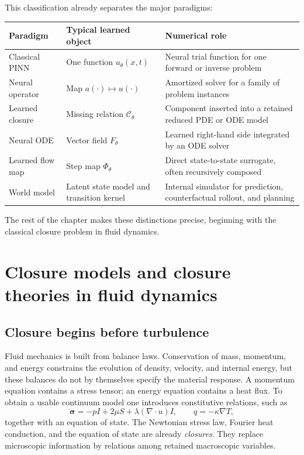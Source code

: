 \documentclass[11pt]{article}
\newcommand{\C}{\mathcal{C}}
\begin{document}
This classification already separates the major paradigms:

\begin{center}
\begin{tabularx}{\textwidth}{@{}P{0.19\textwidth}Y Y@{}}
\toprule
\textbf{Paradigm} & \textbf{Typical learned object} & \textbf{Numerical role} \\
\midrule
Classical PINN & One function \(u_\theta(x,t)\) & Neural trial function for one forward or inverse problem \\
Neural operator & Map \(a(\cdot)\mapsto u(\cdot)\) & Amortized solver for a family of problem instances \\
Learned closure & Missing relation \(\C_\theta\) & Component inserted into a retained reduced PDE or ODE model \\
Neural ODE & Vector field \(F_\theta\) & Learned right-hand side integrated by an ODE solver \\
Learned flow map & Step map \(\Phi_\theta\) & Direct state-to-state surrogate, often recursively composed \\
World model & Latent state model and transition kernel & Internal simulator for prediction, counterfactual rollout, and planning \\
\bottomrule
\end{tabularx}
\end{center}

The rest of the chapter makes these distinctions precise, beginning with the classical closure problem in fluid dynamics.

\section{Closure models and closure theories in fluid dynamics}

\subsection{Closure begins before turbulence}

Fluid mechanics is built from balance laws. Conservation of mass, momentum, and energy constrains the evolution of density, velocity, and internal energy, but these balances do not by themselves specify the material response. A momentum equation contains a stress tensor; an energy equation contains a heat flux. To obtain a usable continuum model one introduces constitutive relations, such as
\[
\boldsymbol{\sigma}
= -pI + 2\mu S + \lambda(\nabla\cdot u)I,
\qquad
q=-\kappa\nabla T,
\]
together with an equation of state. The Newtonian stress law, Fourier heat conduction, and the equation of state are already \emph{closures}. They replace microscopic information by relations among retained macroscopic variables.
\end{document}
